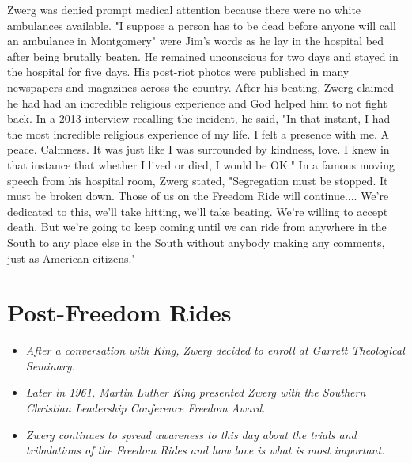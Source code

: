 Zwerg was denied prompt medical attention because there were no white
ambulances available. "I suppose a person has to be dead before anyone
will call an ambulance in Montgomery" were Jim's words as he lay in the
hospital bed after being brutally beaten. He remained unconscious for
two days and stayed in the hospital for five days. His post-riot photos
were published in many newspapers and magazines across the country.
After his beating, Zwerg claimed he had had an incredible religious
experience and God helped him to not fight back. In a 2013 interview
recalling the incident, he said, "In that instant, I had the most
incredible religious experience of my life. I felt a presence with me. A
peace. Calmness. It was just like I was surrounded by kindness, love. I
knew in that instance that whether I lived or died, I would be OK." In a
famous moving speech from his hospital room, Zwerg stated, "Segregation
must be stopped. It must be broken down. Those of us on the Freedom Ride
will continue.... We're dedicated to this, we'll take hitting, we'll
take beating. We're willing to accept death. But we're going to keep
coming until we can ride from anywhere in the South to any place else in
the South without anybody making any comments, just as American
citizens."

\section{Post-Freedom Rides}\label{post-freedom-rides}

\begin{itemize}
\item
  \emph{After a conversation with King, Zwerg decided to enroll at
  Garrett Theological Seminary.}
\item
  \emph{Later in 1961, Martin Luther King presented Zwerg with the
  Southern Christian Leadership Conference Freedom Award.}
\item
  \emph{Zwerg continues to spread awareness to this day about the trials
  and tribulations of the Freedom Rides and how love is what is most
  important.}
\end{itemize}

